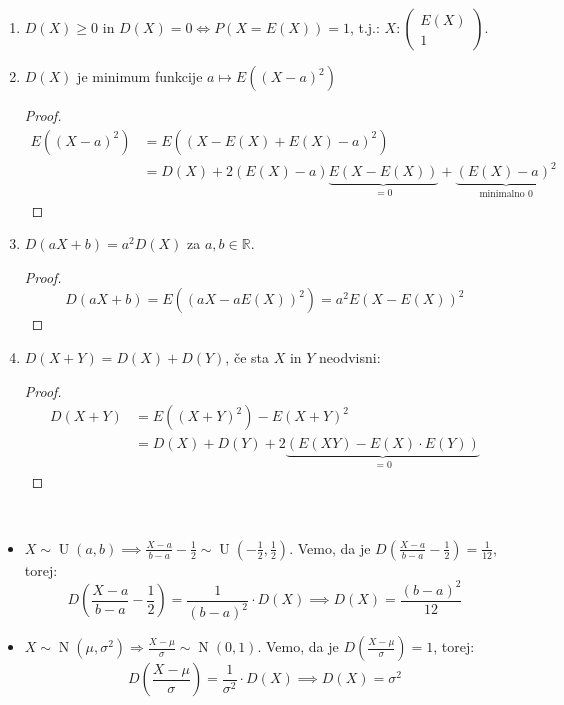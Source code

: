 \documentclass[12pt]{book}
\theoremstyle{definition}
\theoremstyle{plain}
\theoremstyle{plain}
\theoremstyle{plain}
\theoremstyle{remark}
\begin{document}
\begin{enumerate}
    \item $D(X) \geq 0 \text{ in } D(X) = 0 \iff P(X=E(X))=1$, t.j.: $X:\left(\begin{array}{c}E(X) \\ 1 \end{array}\right)$.
    \item $D(X)$ je minimum funkcije $a \mapsto E\left((X-a)^2\right)$
    \begin{proof}
        $$
        \begin{aligned}
            E\left((X-a)^2\right)&=E((X-E(X)+E(X)-a)^2) \\
            &=D(X)+2 (E(X)-a) \underbrace{E(X-E(X))}_{=0}+\underbrace{(E(X)-a)^2}_{\text{minimalno } 0}
        \end{aligned}
        $$
    \end{proof}
    \item $D(aX + b) = a^2 D(X)$ za $a, b\in \mathbb{R}$.
    \begin{proof}
        $$
        D(a X+b)=E\left((a X-a E(X))^2\right)=a^2 E\left(X-E(X)\right)^2
        $$
    \end{proof}
    \item $D(X+Y)=D(X)+D(Y)$, če sta $X$ in $Y$ neodvisni: 
    \begin{proof}
        $$
        \begin{aligned}
            D(X+Y)&=E\left((X+Y)^2\right)-E(X+Y)^2 \\
            &=D(X)+D(Y)+2 \underbrace{(E(X Y)-E(X) \cdot E(Y))}_{=0}    
        \end{aligned}
        $$
    \end{proof}
\end{enumerate}

\begin{zgled}
    ~

    \begin{itemize}
        \item $X \sim \operatorname{U}(a, b) \implies \frac{X-a}{b-a}-\frac{1}{2} \sim \operatorname{U}\left(-\frac{1}{2}, \frac{1}{2}\right)$. Vemo, da je $D\left(\frac{X-a}{b-a}-\frac{1}{2}\right)=\frac{1}{12}$, torej: 
        $$
        D\left(\frac{X-a}{b-a}-\frac{1}{2}\right) = \frac{1}{(b-a)^2} \cdot D(X) \implies D(X)=\frac{(b-a)^2}{12}
        $$
        \item $X \sim \operatorname{N}\left(\mu, \sigma^2\right) \Rightarrow \frac{X-\mu}{\sigma} \sim \operatorname{N}(0,1)$. Vemo, da je $D\left(\frac{X-\mu}{\sigma}\right)=1$, torej: 
        $$
        D\left(\frac{X-\mu}{\sigma}\right)=\frac{1}{\sigma^2} \cdot D(X) \implies D(X)=\sigma^2
        $$
    \end{itemize}
\end{zgled}
\end{document}
